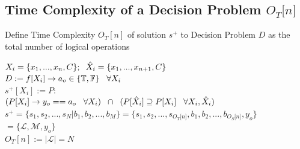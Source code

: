 \documentclass[11pt]{article}
\begin{document}
\subsection{Time Complexity of a Decision Problem $O_T \lbrack n \rbrack$}
Define Time Complexity $O_T [n]$ of solution $s^+$ to Decision Problem $D$ as the total number of logical operations
\begin{center}
\vspace{1mm}
$
X_i = \{x_1,...,x_n,C\}; \hspace{2mm} \hat{X}_i = \{x_1,...,x_{n+1},C\}
$
\\ \vspace{4mm}
$
D := f \lbrack X_i \rbrack \rightarrow a_{o} \in \{\mathbb{T}, \mathbb{F}\} \hspace{3mm} \forall X_i
$
\\ \vspace{4mm}
$
s^+[X_i] := P :
$
\\ \vspace{2mm}
$
(P \lbrack X_i \rbrack \rightarrow y_{o} == a_{o} \hspace{3mm} \forall X_i) \hspace{2mm} \cap \hspace{2mm} (P[\hat{X}_i] \supseteq P[X_i] \hspace{3mm} \forall X_i,\hat{X}_i)
$
\\ \vspace{4mm}
$
s^+ = \{ s_1,s_2,...,s_N|b_1,b_2,...,b_M\} = \{ s_1,s_2,...,s_{O_T \lbrack n \rbrack }, b_1, b_2,...,b_{O_S \lbrack n \rbrack},y_o \}
$
\\ \vspace{2mm}
$
= \{ \mathcal{L},\mathcal{M},y_o\}
$
\\ \vspace{3mm}
$
O_T[n] := |\mathcal{L}| = N
$
\end{center}
\end{document}
